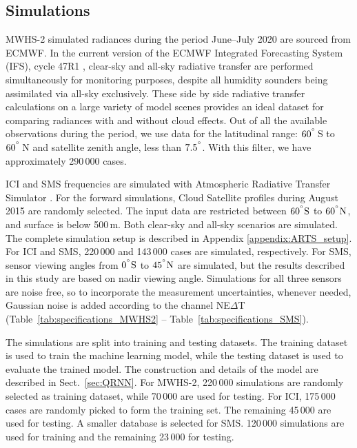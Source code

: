 \documentclass[amt, manuscript]{copernicus}
\begin{document}
\subsection{Simulations}
%
MWHS-2 simulated radiances during the period June--July 2020 are sourced from ECMWF. In the current version of the ECMWF Integrated Forecasting System (IFS), cycle 47R1 \citep{IFS47R1chap1}, clear-sky and all-sky radiative transfer are performed simultaneously for monitoring purposes, despite all humidity sounders being assimilated via all-sky exclusively. These side by side radiative transfer calculations on a large variety of model scenes provides an ideal dataset for comparing radiances with and without cloud effects. Out of all the available observations during the period, we use data for the latitudinal range: $60^{^{\circ}}$\,S to $60^{^{\circ}}$\,N and satellite zenith angle, less than $7.5^{^{\circ}}$. With this filter, we have approximately 290\,000 cases.

ICI and SMS frequencies are simulated with Atmospheric Radiative Transfer Simulator \citep[ARTS,][]{buehler:artst:18}. For the forward simulations, Cloud Satellite \citep[Cloudsat,][]{Stephens2002cloudsat} profiles during August 2015 are randomly selected. The input data are restricted between $60\unit{^{\degree}S}$ to $60\unit{^{\degree}N}$, and surface is below 500\,m. Both clear-sky and all-sky scenarios  are simulated. The complete simulation setup is described in Appendix \ref{appendix:ARTS_setup}. For ICI and SMS, 220\,000 and 143\,000 cases are simulated, respectively. For SMS, sensor viewing angles from $0\unit{^{\degree}S}$ to $45\unit{^{\degree}N}$ are simulated, but the results described in this study are based on nadir viewing angle. Simulations for all three sensors are noise free, so to incorporate the measurement uncertainties, whenever needed, Gaussian noise is added according to the channel NE$\Delta$T (Table~\ref{tab:specifications_MWHS2} -- Table~\ref{tab:specifications_SMS}). 

The simulations are split into training and testing datasets. The training dataset is used to train the machine learning model, while the testing dataset is used to evaluate the trained model. The construction and details of the model are described in Sect.~\ref{sec:QRNN}. For MWHS-2, 220\,000 simulations are randomly selected as training dataset, while 70\,000 are used for testing. For ICI, 175\,000 cases are randomly picked to form the training set. The remaining 45\,000 are used for testing. A smaller database is selected for SMS. 120\,000 simulations are used for training and the remaining 23\,000 for testing.
\end{document}
